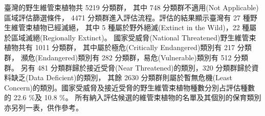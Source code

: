 臺灣的野生維管束植物共 5219 分類群，
其中 748 分類群不適用(Not Applicable)區域評估篩選條件，
4471 分類群進入評估流程。評估的結果顯示臺灣有 27 種野生維管束植物已經滅絕，
其中 5 種屬於野外絕滅(Extinct in the Wild)，22 種屬於區域滅絕(Regionally Extinct)。
國家受威脅(National Threatened)野生維管束植物共有 1011 分類群，
其中屬於極危(Critically Endangered)類別有 217 分類群，
瀕危(Endangered)類別有 282 分類群，易危(Vulnerable)類別有 512 分類群。
另有 481 分類群歸於接近受脅(Near Threatened)的類別，320 分類群歸於資料缺乏(Data Deficient)的類別，
其餘 2630 分類群則屬於暫無危機(Least Concern)的類別。國家受威脅及接近受脅的野生維管束植物種數分別占評估種數的 22.6 \%及 10.8 \%。
所有納入評估候選的維管束植物的名單及其個別的保育類別亦另列一表，供作參考。
